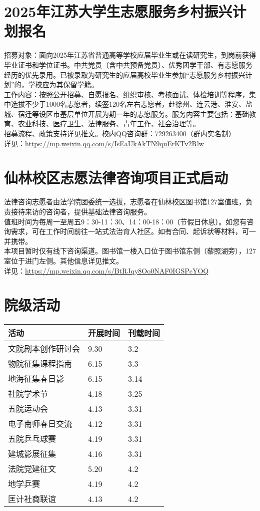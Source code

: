 \documentclass[letterpaper, 12pt]{article}
\begin{document}
\begin{multicols}{2}
\section{2025年江苏大学生志愿服务乡村振兴计划报名}
招募对象：面向2025年江苏省普通高等学校应届毕业生或在读研究生，到岗前获得毕业证书和学位证书。中共党员（含中共预备党员）、优秀团学干部、有志愿服务经历的优先录用。已被录取为研究生的应届高校毕业生参加“志愿服务乡村振兴计划”的，学校应为其保留学籍。
\\工作内容：按照公开招募、自愿报名、组织审核、考核面试、体检培训等程序，集中选拔不少于1000名志愿者，续签120名左右志愿者，赴徐州、连云港、淮安、盐城、宿迁等设区市基层单位开展为期一年的志愿服务。服务内容主要包括：基础教育、农业科技、医疗卫生、法律服务、青年工作、社会治理等。
\\招募流程、政策支持详见推文。校内QQ咨询群：729263400（群内实名制）
\\详见：\url{https://mp.weixin.qq.com/s/IsEaUkAkTN9quErKTv2Rlw}


\section{仙林校区志愿法律咨询项目正式启动}
法律咨询志愿者由法学院团委统一选拔，志愿者在仙林校区图书馆127室值班，负责接待来访的咨询者，提供基础法律咨询服务。
\\值班时间为每周一至周五9：30-11：30、14：00-18：00（节假日休息）。如您有咨询需求，可在工作时间前往一站式法治育人社区。如有合同、起诉状等材料，可一并携带。
\\本项目暂时仅有线下咨询渠道。图书馆一楼入口位于图书馆东侧（藜照湖旁），127室位于进门左侧。其他信息详见推文。
\\详见：\url{https://mp.weixin.qq.com/s/BtRJqy8Oo0NAF0IGSPcYOQ}

\section{院级活动}
\begin{tabular}{|>{\centering\arraybackslash}m{}|m{}|m{}|}
\hline
    活动 & 开展时间 & 刊载时间\\
    \hline\hline
    文院剧本创作研讨会 & 9.30 & 3.2\\
    物院征集课程指南 & 6.15 & 3.3\\
    地海征集春日影 & 6.15 & 3.14\\
    社院学术节 & 4.18 & 3.25\\
    五院运动会 & 4.13 & 3.31\\
    电子南师春日交流 & 4.12 & 3.31\\
    五院乒乓球赛 & 4.19 & 3.31\\
    建城影展征集 & 4.16 & 3.31\\
    法院党建征文 & 5.20 & 4.2\\
    地学乒赛 & 4.19 & 4.2\\
    匡计社商联谊 & 4.13 & 4.2\\
    

\end{tabular}
\end{multicols}
\end{document}

